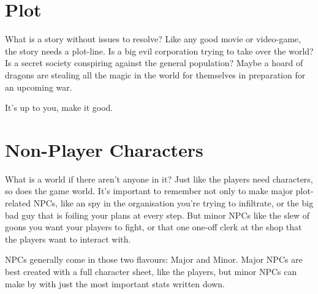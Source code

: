 \section{Plot}
What is a story without issues to resolve? Like any good movie or video-game, the story needs a plot-line.
Is a big evil corporation trying to take over the world?
Is a secret society conspiring against the general population?
Maybe a hoard of dragons are stealing all the magic in the world for themselves in preparation for an upcoming war.

It's up to you, make it good.

\section{Non-Player Characters}
What is a world if there aren't anyone in it?
Just like the players need characters, so does the game world.
It's important to remember not only to make major plot-related NPCs, like an spy in the organisation you're trying to infiltrate, or the big bad guy that is foiling your plans at every step.
But minor NPCs like the slew of goons you want your players to fight, or that one one-off clerk at the shop that the players want to interact with.

NPCs generally come in those two flavours: Major and Minor.
Major NPCs are best created with a full character sheet, like the players, but minor NPCs can make by with just the most important stats written down.